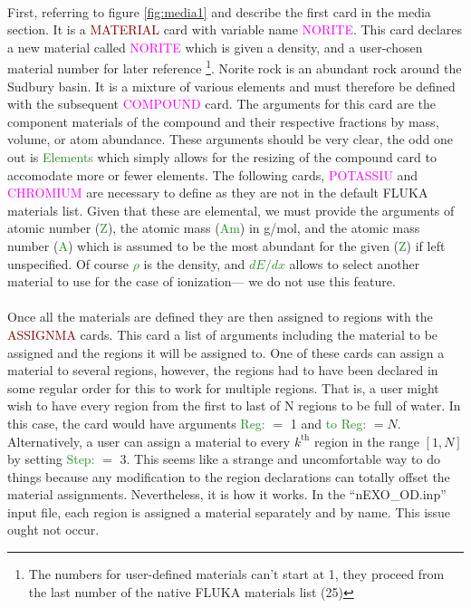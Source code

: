 \paragraph{}
First, referring to figure \ref{fig:media1} and describe the first card in the media section. It is a \textcolor{Maroon}{MATERIAL} card with variable name \textcolor{magenta}{NORITE}. This card declares a new material called \textcolor{magenta}{NORITE} which is given a density, and a user-chosen material number for later reference \footnote{The numbers for user-defined materials can't start at 1, they proceed from the last number of the native FLUKA materials list (25)}. Norite rock is an abundant rock around the Sudbury basin. It is a mixture of various elements and must therefore be defined with the subsequent \textcolor{magenta}{COMPOUND} card. The arguments for this card are the component materials of the compound and their respective fractions by mass, volume, or atom abundance. These arguments should be very clear, the odd one out is \textcolor{ForestGreen}{Elements} which simply allows for the resizing of the compound card to accomodate more or fewer elements. The following cards, \textcolor{magenta}{POTASSIU} and \textcolor{magenta}{CHROMIUM} are necessary to define as they are not in the default FLUKA materials list. Given that these are elemental, we must provide the arguments of atomic number (\textcolor{ForestGreen}{Z}), the atomic mass (\textcolor{ForestGreen}{Am}) in g/mol, and the atomic mass number (\textcolor{ForestGreen}{A}) which is assumed to be the most abundant for the given (\textcolor{ForestGreen}{Z}) if left unspecified. Of course \textcolor{ForestGreen}{$\rho$} is the density, and \textcolor{ForestGreen}{$dE/dx$} allows to select another material to use for the case of ionization— we do not use this feature.

\paragraph{}
Once all the materials are defined they are then assigned to regions with the \textcolor{Maroon}{ASSIGNMA} cards. This card a list of arguments including the material to be assigned and the regions it will be assigned to. One of these cards can assign a material to several regions, however, the regions had to have been declared in some regular order for this to work for multiple regions. That is, a user might wish to have every region from the first to last of N regions to be full of water. In this case, the card would have arguments \textcolor{ForestGreen}{Reg:} $=$ 1 and \textcolor{ForestGreen}{to Reg:} $= N$. Alternatively, a user can assign a material to every $k^{\text{th}}$ region in the range $[1,N]$ by setting \textcolor{ForestGreen}{Step:} $=$ 3. This seems like a strange and uncomfortable way to do things because any modification to the region declarations can totally offset the material assignments. Nevertheless, it is how it works. In the ``nEXO\_OD.inp'' input file, each region is assigned a material separately and by name. This issue ought not occur.

